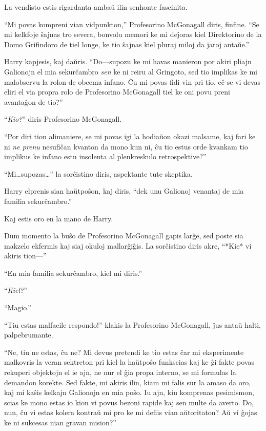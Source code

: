 La vendisto estis rigardanta ambaŭ ilin senhonte fascinita.

``Mi povas kompreni vian vidpunkton,'' Profesorino McGonagall diris,
finfine. ``Se mi kelkfoje ŝajnas tro severa, bonvolu memori ke mi
deĵoras kiel Direktorino de la Domo Grifindoro de tiel longe, ke tio
ŝajnas kiel pluraj miloj da jaroj antaŭe.''

Harry kapjesis, kaj daŭris. ``Do—supozu ke mi havas manieron por akiri
pliajn Galionojn el mia sekurĉambro \emph{sen} ke ni reiru al
Gringoto, sed tio implikas ke mi malobservu la rolon de obeema
infano. Ĉu mi povas fidi vin pri tio, eĉ se vi devas eliri el via
propra rolo de Profesorino McGonagall tiel ke oni povu preni avantaĝon
de tio?''

``\emph{Kio?}'' diris Profesorino McGonagall.

``Por diri tion alimaniere, se mi povas igi la hodiaŭon okazi malsame,
kaj fari ke ni \emph{ne prenu} nesufiĉan kvanton da mono kun ni, ĉu
tio estus orde kvankam tio implikus ke infano estu insolenta al
plenkreskulo retrospektive?''

``Mi\ldots supozas\ldots'' la sorĉistino diris, aspektante tute skeptika.

Harry elprenis sian haŭtpoŝon, kaj diris, ``dek unu Galionoj venantaj
de mia familia sekurĉambro.''

Kaj estis oro en la mano de Harry.

Dum momento la buŝo de Profesorino McGonagall gapis larĝe, sed poste
sia makzelo ekfermis kaj siaj okuloj mallarĝiĝis. La sorĉistino diris
akre, ``*Kie* vi akiris tion—''

``En mia familia sekurĉambro, kiel mi diris.''

``\emph{Kiel?}''

``Magio.''

``Tiu estas malfacile respondo!'' klakis la Profesorino McGonagall,
ĵus antaŭ halti, palpebrumante.

``Ne, tiu ne estas, ĉu ne? Mi devus pretendi ke tio estas ĉar mi
eksperimente malkovris la veran sektreton pri kiel la haŭtpoŝo
funkscias kaj ke ĝi fakte povas rekuperi objektojn el ie ajn, ne nur
el ĝia propa interno, se mi formulas la demandon korekte. Sed fakte,
mi akiris ilin, kiam mi falis sur la amaso da oro, kaj mi kaŝis
kelkajn Galionojn en mia poŝo. Iu ajn, kiu komprenas pesimismon, scias
ke mono estas io kion vi povus bezoni rapide kaj sen multe da
averto. Do, nun, ĉu vi estas kolera kontraŭ mi pro ke mi defiis vian
aŭtoritaton? Aŭ vi ĝojas ke ni sukcesas nian gravan mision?''

